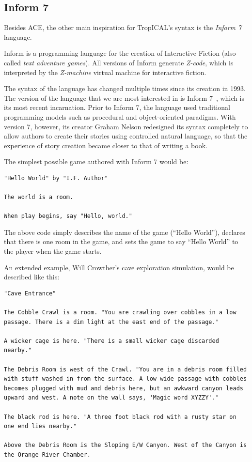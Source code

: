 \documentclass[11pt]{report}
\begin{document}
\subsection{Inform 7}
Besides ACE, the other main inspiration for TropICAL's syntax is the
\emph{Inform 7} language.

Inform is a programming language for the creation of Interactive Fiction (also
called \emph{text adventure games}). All versions of Inform generate
\emph{Z-code}, which is interpreted by the \emph{Z-machine} virtual machine for
interactive fiction.

The syntax of the language has changed multiple times since its creation in
1993. The version of the language that we are most interested in is Inform 7~\citep{reed2010creating},
which is its most recent incarnation. Prior to Inform 7, the language used
traditional programming models such as procedural and object-oriented paradigms.
With version 7, however, its creator Graham Nelson redesigned its
syntax completely to allow authors to create their stories using controlled
natural language, so that the experience of story creation became closer to that
of writing a book.

The simplest possible game authored with Inform 7 would be:

\begin{lstlisting}[showstringspaces=false]
"Hello World" by "I.F. Author"

The world is a room.

When play begins, say "Hello, world."
\end{lstlisting}

The above code simply describes the name of the game (``Hello World''), declares
that there is one room in the game, and sets the game to say ``Hello World'' to
the player when the game starts.

An extended example, Will Crowther's cave exploration simulation, would be
described like this:

\begin{lstlisting}[showstringspaces=false]
"Cave Entrance"

The Cobble Crawl is a room. "You are crawling over cobbles in a low passage. There is a dim light at the east end of the passage."

A wicker cage is here. "There is a small wicker cage discarded nearby."

The Debris Room is west of the Crawl. "You are in a debris room filled with stuff washed in from the surface. A low wide passage with cobbles becomes plugged with mud and debris here, but an awkward canyon leads upward and west. A note on the wall says, 'Magic word XYZZY'."

The black rod is here. "A three foot black rod with a rusty star on one end lies nearby."

Above the Debris Room is the Sloping E/W Canyon. West of the Canyon is the Orange River Chamber.
\end{lstlisting}
\end{document}
